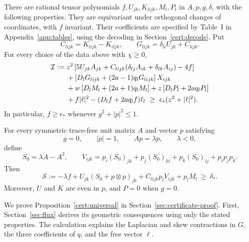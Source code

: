 \begin{proposition}\label{cert:universal}
There are rational tensor polynomials $f,U_{jk},K_{lijk},M_l,P_l$ in
$A,p,g,\delta$, with the following properties. They are equivariant under
orthogonal changes of coordinates, with $f$ invariant. Their coefficients
are specified by Table~I in Appendix~\ref{app:tables}, using the decoding in
Section~\ref{cert:decode}. Put
\[
 C_{lijk}=K_{lijk}-K_{iljk},\qquad
 G_{lijk}=\delta_{li}U_{jk}+C_{lijk}.
\]
For every choice of the data above with $\chi\ge0$,
\begin{align}
 \mathcal I:={}&z^2\left[5U_{jk}A_{jk}
       +C_{lijk}(\delta_{lj}A_{ik}+\delta_{lk}A_{ij})-4f\right]\notag\\
 &+\left[D_lG_{lijk}+(2a-1)q_lG_{lijk}\right]X_{ijk}\notag\\
 &+w\left[D_lM_l+(2a+1)q_lM_l\right]
       +z\left[D_lP_l+2aq_lP_l\right]\notag\\
 &+f|\ell|^2-(D_lf+2aq_lf)\ell_l
 \ \ge\ \epsilon_*(z^2+|\ell|^2).\label{cert:interior}
\end{align}
In particular, $f\ge\epsilon_*$ whenever $g^2+|p|^2\le1$.

For every symmetric trace-free unit matrix $A$ and vector $p$ satisfying
\[
 g=0,\qquad |p|=1,\qquad Ap=\lambda p,\qquad\lambda<0,
\]
define
\[
 S_0=\lambda A-A^2,\qquad
 V_{ijk}=p_i(S_0)_{jk}+p_j(S_0)_{ki}+p_k(S_0)_{ij}+p_ip_jp_k.
\]
Then
\begin{equation}\label{cert:boundary}
 \mathcal S:=-\lambda f+U_{jk}(S_0+p\otimes p)_{jk}
                 +C_{lijk}p_lV_{ijk}+p_lM_l
 \ \ge\ \delta_*.
\end{equation}
Moreover, $U$ and $K$ are even in $p$, and $P=0$ when $g=0$.
\end{proposition}

We prove Proposition~\ref{cert:universal} in
Section~\ref{sec:certificate-proof}. First, Section~\ref{sec:flux}
derives its geometric consequences using only the stated properties.
The calculation explains the Laplacian and skew contractions in
$G$, the three coefficients of $q$, and the free vector $\ell$.
